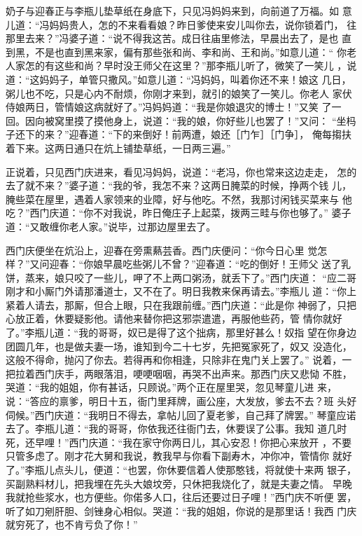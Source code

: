 奶子与迎春正与李瓶儿垫草纸在身底下，只见冯妈妈来到，向前道了万福。如
意儿道：“冯妈妈贵人，怎的不来看看娘？昨日爹使来安儿叫你去，说你锁着门，
往那里去来？”冯婆子道：“说不得我这苦。成日往庙里修法，早晨出去了，是也
直到黑，不是也直到黑来家，偏有那些张和尚、李和尚、王和尚。”如意儿道：“
你老人家怎的有这些和尚？早时没王师父在这里？”那李瓶儿听了，微笑了一笑儿
，说道：“这妈妈子，单管只撒风。”如意儿道：“冯妈妈，叫着你还不来！娘这
几日，粥儿也不吃，只是心内不耐烦，你刚才来到，就引的娘笑了一笑儿。你老人
家伏侍娘两日，管情娘这病就好了。”冯妈妈道：“我是你娘退灾的博士！”又笑
了一回。因向被窝里摸了摸他身上，说道：“我的娘，你好些儿也罢了！”又问：
“坐杩子还下的来？”迎春道：“下的来倒好！前两遭，娘还［门乍］［门争］，
俺每搊扶着下来。这两日通只在炕上铺垫草纸，一日两三遍。”

正说着，只见西门庆进来，看见冯妈妈，说道：“老冯，你也常来这边走走，
怎的去了就不来？”婆子道：“我的爷，我怎不来？这两日腌菜的时候，挣两个钱
儿，腌些菜在屋里，遇着人家领来的业障，好与他吃。不然，我那讨闲钱买菜来与
他吃？”西门庆道：“你不对我说，昨日俺庄子上起菜，拨两三畦与你也够了。”
婆子道：“又敢缠你老人家。”说毕，过那边屋里去了。

西门庆便坐在炕沿上，迎春在旁熏爇芸香。西门庆便问：“你今日心里
觉怎样？”又问迎春：“你娘早晨吃些粥儿不曾？”迎春道：“吃的倒好！王师父
送了乳饼，蒸来，娘只咬了一些儿，呷了不上两口粥汤，就丢下了。”西门庆道：
“应二哥刚才和小厮门外请那潘道士，又不在了。明日我教来保再请去。”李瓶儿
道：“你上紧着人请去，那厮，但合上眼，只在我跟前缠。”西门庆道：“此是你
神弱了，只把心放正着，休要疑影他。请他来替你把这邪崇遣遣，再服他些药，管
情你就好了。”李瓶儿道：“我的哥哥，奴已是得了这个拙病，那里好甚么！奴指
望在你身边团圆几年，也是做夫妻一场，谁知到今二十七岁，先把冤家死了，奴又
没造化，这般不得命，抛闪了你去。若得再和你相逢，只除非在鬼门关上罢了。”
说着，一把拉着西门庆手，两眼落泪，哽哽咽咽，再哭不出声来。那西门庆又悲恸
不胜，哭道：“我的姐姐，你有甚话，只顾说。”两个正在屋里哭，忽见琴童儿进
来，说：“答应的禀爹，明日十五，衙门里拜牌，画公座，大发放，爹去不去？班
头好伺候。”西门庆道：“我明日不得去，拿帖儿回了夏老爹，自己拜了牌罢。”
琴童应诺去了。李瓶儿道：“我的哥哥，你依我还往衙门去，休要误了公事。我知
道几时死，还早哩！”西门庆道：“我在家守你两日儿，其心安忍！你把心来放开
，不要只管多虑了。刚才花大舅和我说，教我早与你看下副寿木，冲你冲，管情你
就好了。”李瓶儿点头儿，便道：“也罢，你休要信着人使那憨钱，将就使十来两
银子，买副熟料材儿，把我埋在先头大娘坟旁，只休把我烧化了，就是夫妻之情。
早晚我就抢些浆水，也方便些。你偌多人口，往后还要过日子哩！”西门庆不听便
罢，听了如刀剜肝胆、剑锉身心相似。哭道：“我的姐姐，你说的是那里话！我西
门庆就穷死了，也不肯亏负了你！”

